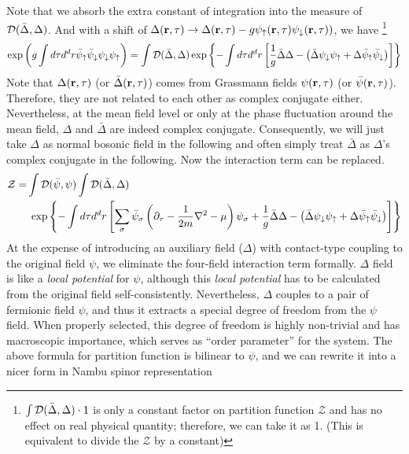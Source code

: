 Note that we absorb the extra constant of integration into the measure of $\mathcal{D}(\bar\Delta,\Delta)$.
And with a shift of $\Delta(\mathbf{r},\tau)\rightarrow\Delta(\mathbf{r},\tau)-g\psi_{\uparrow}(\mathbf{r},\tau)\psi_{\downarrow}(\mathbf{r},\tau))$, we have 
\footnote{$\int{\ensuremath{\mathcal{D}}(\bar\Delta,\Delta)}\cdot1$ is only a constant factor on partition function $\mathcal{Z}$ and has no effect on real physical quantity; therefore, we can take it as 1. (This is equivalent to  divide the $\mathcal{Z}$ by a constant)}
\begin{equation}\label{eq:pathInt:expHS}
\exp\left(g\int{d\tau{}d^{d}r}\bar{\psi}_{\uparrow}\bar\psi_{\downarrow}\psi_{\downarrow}\psi_{\uparrow}\right)=
\int{\ensuremath{\mathcal{D}}(\bar\Delta,\Delta)}\exp\left\{-\int{d\tau{d^{d}r}}\left[\frac{1}{g}{\bar\Delta}{\Delta}-\left(\bar\Delta\psi_{\downarrow}\psi_{\uparrow}+\Delta\bar\psi_{\uparrow}\bar\psi_{\downarrow}\right)\right]\right\}
\end{equation}
Note that  $\Delta(\mathbf{r},\tau)$ (or $\bar\Delta(\mathbf{r},\tau)$) comes from  Grassmann fields $\psi(\mathbf{r},\tau)$ (or $\bar\psi(\mathbf{r},\tau)$). Therefore, they are not related to each other as complex conjugate either.  Nevertheless, at the mean field level or only at the phase fluctuation around the mean field, $\Delta$  and $\bar\Delta$ are indeed complex conjugate.  Consequently, we will just take $\Delta$  as normal bosonic field in the following and often simply treat $\bar\Delta$ as $\Delta$'s complex conjugate in the following. Now the interaction term can be replaced.
\begin{align*}
\mathcal{Z}=&\int{}\mathcal{D}(\bar\psi,\psi)\int{\ensuremath{\mathcal{D}}(\bar\Delta,\Delta)}\\
&\;\exp\left\{-\int{d\tau{d^{d}r}}\left[\sum_{\sigma}\bar\psi_{\sigma}\left(\partial_{\tau}-\frac{1}{2m}\nabla^{2}-\mu\right)\psi_{\sigma}+\frac{1}{g}{\bar\Delta}{\Delta}-\left(\bar\Delta\psi_{\downarrow}\psi_{\uparrow}+\Delta\bar\psi_{\uparrow}\bar\psi_{\downarrow}\right)\right]\right\}
\end{align*}
At the expense of introducing an auxiliary field ($\Delta$) with contact-type coupling to the original field $\psi$, we eliminate the four-field interaction term formally.  $\Delta$ field is like a \emph{local potential} for $\psi$, although this \emph{local potential} has to be calculated from the original field self-consistently.  Nevertheless, $\Delta$ couples to a pair of fermionic field $\psi$, and thus it extracts a special degree of freedom from the $\psi$ field.  When properly selected, this degree of freedom is highly non-trivial and has macroscopic importance, which serves as ``order parameter'' for the system.  The above formula for partition function is bilinear to $\psi$, and we can rewrite it into a nicer form in Nambu spinor representation
